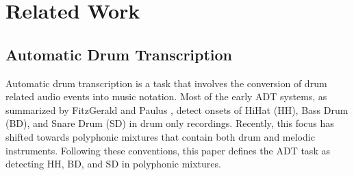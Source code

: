 \documentclass{article}
\begin{document}

%
\section{Related Work}
\label{sec:relatedwork}
%
\subsection{Automatic Drum Transcription}

Automatic drum transcription is a task that involves the conversion of drum related audio events into music notation. 
Most of the early ADT systems, as summarized by FitzGerald and Paulus \cite{FitzGerald2006}, detect onsets of HiHat (HH), Bass Drum (BD), and Snare Drum (SD) in drum only recordings. 
Recently, this focus has shifted towards polyphonic mixtures that contain both drum and melodic instruments. Following these conventions, this paper defines the ADT task as detecting HH, BD, and SD in polyphonic mixtures. 
\end{document}

